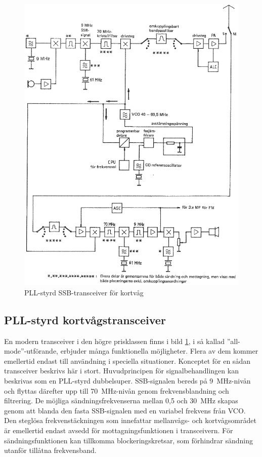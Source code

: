\begin{figure}
  \includegraphics[width=\textwidth]{images/cropped_pdfs/bild_2_5-15.pdf}
  \caption{PLL-styrd SSB-transceiver för kortvåg}
  \label{fig:bildII5-15}
\end{figure}

\subsection{PLL-styrd kortvågstransceiver}

En modern transceiver i den högre prisklassen finns i bild \ref{fig:bildII5-15},
i så kallad ''all-mode''-utförande, erbjuder många funktionella möjligheter.
Flera av dem kommer emellertid endast till användning i speciella situationer.
Konceptet för en sådan transceiver beskrivs här i stort.
Huvudprincipen för signalbehandlingen kan beskrivas som en PLL-styrd
dubbelsuper.
SSB-signalen bereds på 9~MHz-nivån och flyttas därefter upp till
70~MHz-nivån genom frekvensblandning och filtrering.
De möjliga sändningsfrekvenserna mellan 0,5 och 30~MHz skapas genom att
blanda den fasta SSB-signalen med en variabel frekvens från VCO.
Den steglösa frekvenstäckningen som innefattar mellanvågs- och kortvågsområdet
är emellertid endast avsedd för mottagningsfunktionen i transceivern.
För sändningsfunktionen kan tillkomma blockeringskretsar, som förhindrar
sändning utanför tillåtna frekvensband.

